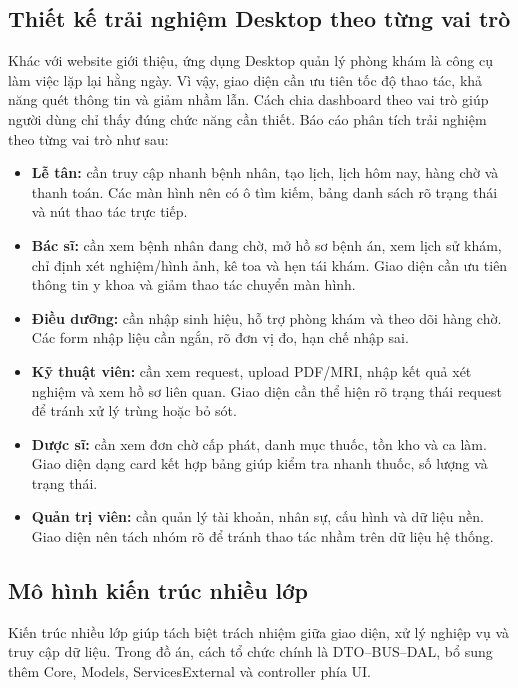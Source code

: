 \documentclass[12pt,a4paper]{article}
\numberwithin{figure}{subsection}
\numberwithin{table}{subsection}
\begin{document}
\subsection{Thiết kế trải nghiệm Desktop theo từng vai trò}

Khác với website giới thiệu, ứng dụng Desktop quản lý phòng khám là công cụ làm việc lặp lại hằng ngày. Vì vậy, giao diện cần ưu tiên tốc độ thao tác, khả năng quét thông tin và giảm nhầm lẫn. Cách chia dashboard theo vai trò giúp người dùng chỉ thấy đúng chức năng cần thiết. Báo cáo phân tích trải nghiệm theo từng vai trò như sau:

\begin{itemize}
    \item \textbf{Lễ tân:} cần truy cập nhanh bệnh nhân, tạo lịch, lịch hôm nay, hàng chờ và thanh toán. Các màn hình nên có ô tìm kiếm, bảng danh sách rõ trạng thái và nút thao tác trực tiếp.
    \item \textbf{Bác sĩ:} cần xem bệnh nhân đang chờ, mở hồ sơ bệnh án, xem lịch sử khám, chỉ định xét nghiệm/hình ảnh, kê toa và hẹn tái khám. Giao diện cần ưu tiên thông tin y khoa và giảm thao tác chuyển màn hình.
    \item \textbf{Điều dưỡng:} cần nhập sinh hiệu, hỗ trợ phòng khám và theo dõi hàng chờ. Các form nhập liệu cần ngắn, rõ đơn vị đo, hạn chế nhập sai.
    \item \textbf{Kỹ thuật viên:} cần xem request, upload PDF/MRI, nhập kết quả xét nghiệm và xem hồ sơ liên quan. Giao diện cần thể hiện rõ trạng thái request để tránh xử lý trùng hoặc bỏ sót.
    \item \textbf{Dược sĩ:} cần xem đơn chờ cấp phát, danh mục thuốc, tồn kho và ca làm. Giao diện dạng card kết hợp bảng giúp kiểm tra nhanh thuốc, số lượng và trạng thái.
    \item \textbf{Quản trị viên:} cần quản lý tài khoản, nhân sự, cấu hình và dữ liệu nền. Giao diện nên tách nhóm rõ để tránh thao tác nhầm trên dữ liệu hệ thống.
\end{itemize}

\subsection{Mô hình kiến trúc nhiều lớp}

Kiến trúc nhiều lớp giúp tách biệt trách nhiệm giữa giao diện, xử lý nghiệp vụ và truy cập dữ liệu. Trong đồ án, cách tổ chức chính là DTO--BUS--DAL, bổ sung thêm Core, Models, ServicesExternal và controller phía UI.
\end{document}
